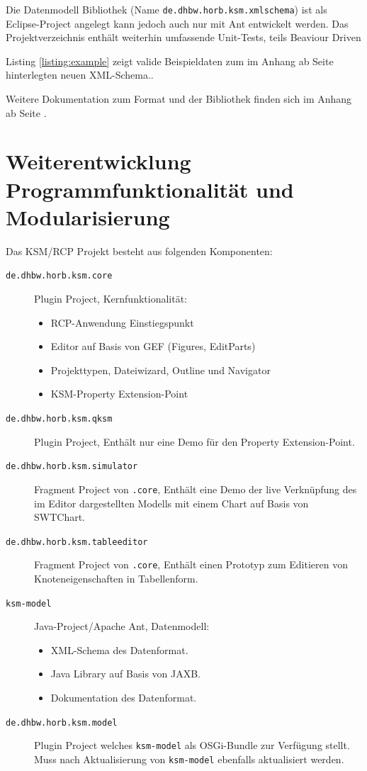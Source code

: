 \documentclass[%
12pt,titlepage,abstracton]{scrreprt}
\begin{document}
Die Datenmodell Bibliothek (Name
\texttt{de.\-dhbw.\-horb.\-ksm.\-xmlschema}) ist als Eclipse-Project angelegt
kann jedoch auch nur mit Ant entwickelt werden. Das Projektverzeichnis enthält
weiterhin umfassende Unit-Tests, teils Beaviour Driven

Listing \ref{listing:example} zeigt valide Beispieldaten zum im Anhang ab Seite
\pageref{listing:schema} hinterlegten neuen XML-Schema..

\label{listing:example}


Weitere Dokumentation zum Format und der Bibliothek finden sich im Anhang ab
Seite \pageref{chapter:doku-datamodel}.


\chapter{Weiterentwicklung Programmfunktionalität und
Modularisierung}\label{chapter:weiterentwicklung}

Das KSM/RCP Projekt besteht aus folgenden Komponenten:
\begin{description}
  \item[\texttt{de.\-dhbw.\-horb.\-ksm.\-core}] Plugin
  Project, Kernfunktionalität:
  \begin{itemize}
    \item RCP-Anwendung Einstiegspunkt
  	\item Editor auf Basis von GEF (Figures, EditParts)
  	\item Projekttypen, Dateiwizard, Outline und Navigator
  	\item KSM-Property Extension-Point
  \end{itemize}
  \item[\texttt{de.\-dhbw.\-horb.\-ksm.\-qksm}] Plugin Project, Enthält nur
  eine Demo für den Property Extension-Point.
  \item[\texttt{de.\-dhbw.\-horb.\-ksm.\-simulator}] Fragment Project von
  \texttt{.core}, Enthält eine Demo der
  live Verknüpfung des im Editor dargestellten Modells mit einem Chart auf Basis
  von SWTChart.
  \item[\texttt{de.\-dhbw.\-horb.\-ksm.\-tableeditor}] Fragment Project von
  \texttt{.core}, Enthält einen Prototyp
  zum Editieren von Knoteneigenschaften in Tabellenform.
  \item[\texttt{ksm-model}]
  Java-Project/Apache Ant, Datenmodell:
  \begin{itemize}
    \item XML-Schema des Datenformat.
    \item Java Library auf Basis von JAXB.
    \item Dokumentation des Datenformat.
  \end{itemize}
  \item[\texttt{de.\-dhbw.\-horb.\-ksm.\-model}] Plugin Project welches
  \texttt{ksm-model} als OSGi-Bundle zur Verfügung stellt. Muss nach
  Aktualisierung von \texttt{ksm-model} ebenfalls aktualisiert werden.
\end{description}
\end{document}
